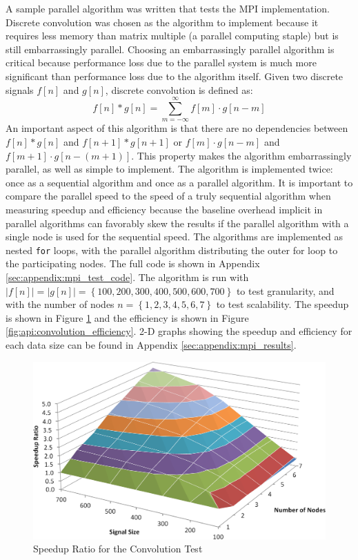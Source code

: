 A sample parallel algorithm was written that tests the MPI implementation. Discrete convolution was chosen as the algorithm to implement because it requires less memory than matrix multiple (a parallel computing staple) but is still embarrassingly parallel. Choosing an embarrassingly parallel algorithm is critical because performance loss due to the parallel system is much more significant than performance loss due to the algorithm itself. Given two discrete signals $f[n]$ and $g[n]$, discrete convolution is defined as:
\[
f[n]*g[n]=\sum_{m=-\infty}^\infty f[m]\cdot g[n-m]
\]
An important aspect of this algorithm is that there are no dependencies between $f[n]*g[n]$ and $f[n+1]*g[n+1]$ or $f[m]\cdot g[n-m]$ and $f[m+1]\cdot g[n-(m+1)]$. This property makes the algorithm embarrassingly parallel, as well as simple to implement. The algorithm is implemented twice: once as a sequential algorithm and once as a parallel algorithm. It is important to compare the parallel speed to the speed of a truly sequential algorithm when measuring speedup and efficiency because the baseline overhead implicit in parallel algorithms can favorably skew the results if the parallel algorithm with a single node is used for the sequential speed. The algorithms are implemented as nested \lstinline$for$ loops, with the parallel algorithm distributing the outer for loop to the participating nodes. The full code is shown in Appendix \ref{sec:appendix:mpi_test_code}. The algorithm is run with $\left| f[n]\right| =\left| g[n]\right| =\left\{ 100,200,300,400,500,600,700\right\}$ to test granularity, and with the number of nodes $n=\left\{ 1,2,3,4,5,6,7\right\}$ to test scalability. The speedup is shown in Figure \ref{fig:api:convolution_speedup} and the efficiency is shown in Figure \ref{fig:api:convolution_efficiency}. 2-D graphs showing the speedup and efficiency for each data size can be found in Appendix \ref{sec:appendix:mpi_results}.

\begin{landscape}
	\begin{figure}[p]
		\begin{centering}
			\includegraphics[width=8.5in]{API/Figures/api-convolution_speedup.png}
			\caption{Speedup Ratio for the Convolution Test}
			\label{fig:api:convolution_speedup}
		\end{centering}
	\end{figure}
\end{landscape}

